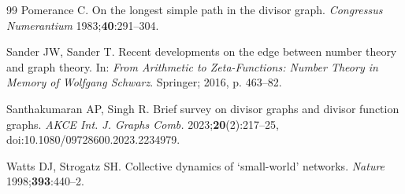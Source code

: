 \documentclass[11pt]{article}
\theoremstyle{plain}
\theoremstyle{definition}
\begin{document}
\begin{thebibliography}{99}
Pomerance C. On the longest simple path in the divisor graph.
\emph{Congressus Numerantium} 1983;\textbf{40}:291--304.

Sander JW, Sander T. Recent developments on the edge between number theory and graph theory.
In: \emph{From Arithmetic to Zeta-Functions: Number Theory in Memory of Wolfgang Schwarz}.
Springer; 2016, p. 463--82.

Santhakumaran AP, Singh R. Brief survey on divisor graphs and divisor function graphs.
\emph{AKCE Int. J. Graphs Comb.} 2023;\textbf{20}(2):217--25, doi:10.1080/09728600.2023.2234979.

Watts DJ, Strogatz SH. Collective dynamics of `small-world' networks.
\emph{Nature} 1998;\textbf{393}:440--2.

\end{thebibliography}
\end{document}
